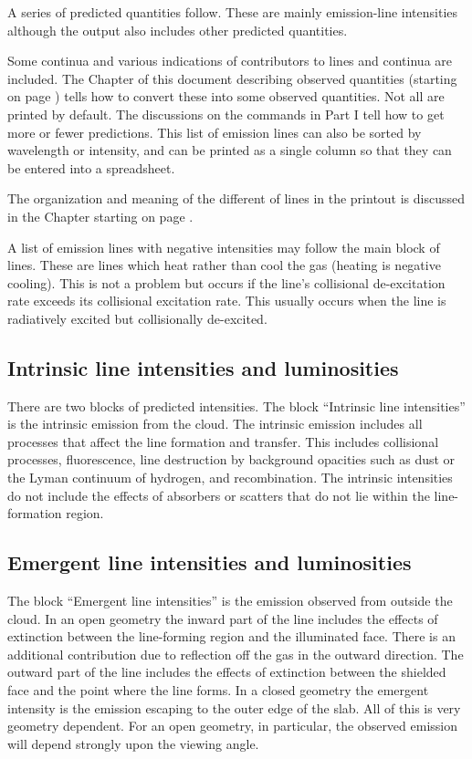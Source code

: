 A series of predicted quantities follow.
These are mainly emission-line
intensities although the output also includes other predicted quantities.

Some continua and various indications of contributors to lines and
continua are included.
The Chapter of this document describing observed
quantities (starting on page \pageref{sec:ObservedQuantities})
tells how to convert these into some observed quantities.
Not all
are printed by default.
The discussions on the  commands in Part I
tell how to get more or fewer predictions.
This list
of emission lines can also be sorted by wavelength or intensity, and can
be printed as a single column so that they can be entered into a spreadsheet.

The organization and meaning of the different of lines in the printout
is discussed in the Chapter 
starting on page \pageref{sec:EmissionLines}.

A list of emission lines with negative intensities may follow the main
block of lines.
These are lines which heat rather than cool the gas (heating
is negative cooling).
This is not a problem but occurs if the line's
collisional de-excitation rate exceeds its collisional excitation rate.
This usually occurs when the line is radiatively excited but collisionally
de-excited.

\subsection{Intrinsic line intensities and luminosities}

There are two blocks of predicted intensities.
The block ``Intrinsic line intensities'' is the intrinsic emission
from the cloud.
The intrinsic
emission includes all processes that affect the line formation and transfer.
This includes collisional processes, fluorescence, line destruction by
background opacities such as dust or the Lyman continuum of hydrogen, and
recombination.
The intrinsic intensities do not include the effects of
absorbers or scatters that do not lie within the line-formation region.

\subsection{Emergent line intensities and luminosities}

The block ``Emergent line intensities'' is the emission observed from
outside the cloud.
In an open geometry the inward part of the line includes
the effects of extinction between the line-forming region and the illuminated
face.
There is an additional contribution due to reflection off the gas
in the outward direction.
The outward part of the line includes the effects
of extinction between the shielded face and the point where the line forms.
In a closed geometry the emergent intensity is the emission escaping to
the outer edge of the slab.
All of this is very geometry dependent.
For an open geometry, in particular, the observed
emission will depend strongly upon the viewing angle.

